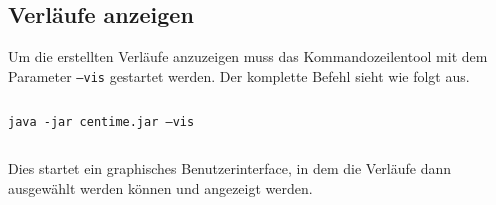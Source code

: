 	\subsection*{Verläufe anzeigen}
	Um die erstellten Verläufe anzuzeigen muss das Kommandozeilentool mit dem Parameter \texttt{--vis}  gestartet werden. Der 	komplette Befehl sieht wie folgt aus.
	
	$\ $
	
	\noindent\texttt{java -jar centime.jar --vis}
	
	$\ $
	
	Dies startet ein graphisches Benutzerinterface, in dem die Verläufe dann ausgewählt werden können und angezeigt werden.
